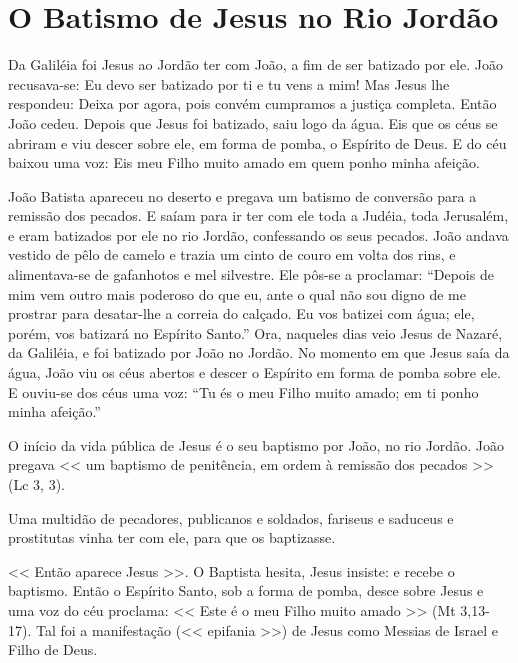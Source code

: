 \documentclass{rosario}
\begin{document}

\section{O Batismo de Jesus no Rio Jordão}


Da Galiléia foi Jesus ao Jordão ter com João, a fim de ser batizado por ele.
João recusava-se: Eu devo ser batizado por ti e tu vens a mim!
Mas Jesus lhe respondeu:
Deixa por agora, pois convém cumpramos a justiça completa.
Então João cedeu.
Depois que Jesus foi batizado, saiu logo da água.
Eis que os céus se abriram e viu descer sobre ele, em forma de pomba, o Espírito de Deus.
E do céu baixou uma voz:
Eis meu Filho muito amado em quem ponho minha afeição.


João Batista apareceu no deserto e pregava um batismo de conversão para a remissão dos pecados.
E saíam para ir ter com ele toda a Judéia, toda Jerusalém, e eram batizados por ele no rio Jordão, confessando os seus pecados.
João andava vestido de pêlo de camelo e trazia um cinto de couro em volta dos rins, e alimentava-se de gafanhotos e mel silvestre.
Ele pôs-se a proclamar:
``Depois de mim vem outro mais poderoso do que eu, ante o qual não sou digno de me prostrar para desatar-lhe a correia do calçado.
Eu vos batizei com água; ele, porém, vos batizará no Espírito Santo.''
Ora, naqueles dias veio Jesus de Nazaré, da Galiléia, e foi batizado por João no Jordão.
No momento em que Jesus saía da água, João viu os céus abertos e descer o Espírito em forma de pomba sobre ele.
E ouviu-se dos céus uma voz:
``Tu és o meu Filho muito amado; em ti ponho minha afeição.''




O início da vida pública de Jesus é o seu baptismo por João, no rio Jordão.
João pregava << um baptismo de penitência, em ordem à remissão dos pecados >> (Lc 3, 3).

Uma multidão de pecadores, publicanos e soldados, fariseus e saduceus e prostitutas vinha ter com ele, para que os baptizasse.

<< Então aparece Jesus >>.
O Baptista hesita, Jesus insiste:
e recebe o baptismo.
Então o Espírito Santo, sob a forma de pomba, desce sobre Jesus e uma voz do céu proclama:
<< Este é o meu Filho muito amado >> (Mt 3,13-17).
Tal foi a manifestação (<< epifania >>) de Jesus como Messias de Israel e Filho de Deus.
\end{document}
